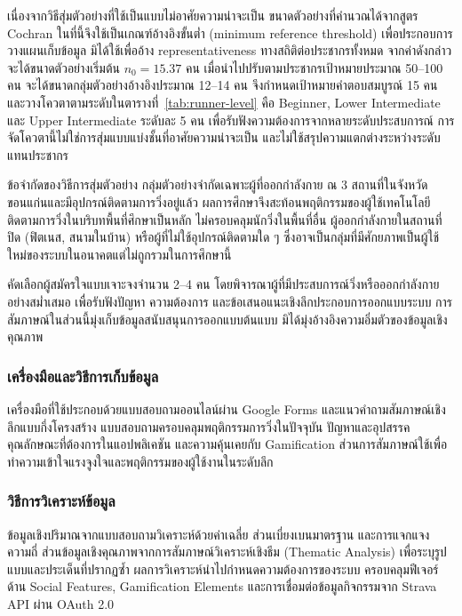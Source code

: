เนื่องจากวิธีสุ่มตัวอย่างที่ใช้เป็นแบบไม่อาศัยความน่าจะเป็น ขนาดตัวอย่างที่คำนวณได้จากสูตร Cochran ในที่นี้จึงใช้เป็นเกณฑ์อ้างอิงขั้นต่ำ (minimum reference threshold) เพื่อประกอบการวางแผนเก็บข้อมูล มิได้ใช้เพื่ออ้าง representativeness ทางสถิติต่อประชากรทั้งหมด จากค่าดังกล่าวจะได้ขนาดตัวอย่างเริ่มต้น $n_0=15.37$ คน เมื่อนำไปปรับตามประชากรเป้าหมายประมาณ 50--100 คน
จะได้ขนาดกลุ่มตัวอย่างอ้างอิงประมาณ 12--14 คน จึงกำหนดเป้าหมายคำตอบสมบูรณ์ 15 คน และวางโควตาตามระดับในตารางที่~\ref{tab:runner-level} คือ Beginner, Lower Intermediate และ Upper Intermediate ระดับละ 5 คน เพื่อรับฟังความต้องการจากหลายระดับประสบการณ์ การจัดโควตานี้ไม่ใช่การสุ่มแบบแบ่งชั้นที่อาศัยความน่าจะเป็น และไม่ใช้สรุปความแตกต่างระหว่างระดับแทนประชากร

ข้อจำกัดของวิธีการสุ่มตัวอย่าง กลุ่มตัวอย่างจำกัดเฉพาะผู้ที่ออกกำลังกาย ณ 3 สถานที่ในจังหวัดขอนแก่นและมีอุปกรณ์ติดตามการวิ่งอยู่แล้ว ผลการศึกษาจึงสะท้อนพฤติกรรมของผู้ใช้เทคโนโลยีติดตามการวิ่งในบริบทพื้นที่ศึกษาเป็นหลัก ไม่ครอบคลุมนักวิ่งในพื้นที่อื่น ผู้ออกกำลังกายในสถานที่ปิด (ฟิตเนส, สนามในบ้าน) หรือผู้ที่ไม่ใช้อุปกรณ์ติดตามใด ๆ ซึ่งอาจเป็นกลุ่มที่มีศักยภาพเป็นผู้ใช้ใหม่ของระบบในอนาคตแต่ไม่ถูกรวมในการศึกษานี้

คัดเลือกผู้สมัครใจแบบเจาะจงจำนวน 2--4 คน โดยพิจารณาผู้ที่มีประสบการณ์วิ่งหรือออกกำลังกายอย่างสม่ำเสมอ เพื่อรับฟังปัญหา ความต้องการ และข้อเสนอแนะเชิงลึกประกอบการออกแบบระบบ การสัมภาษณ์ในส่วนนี้มุ่งเก็บข้อมูลสนับสนุนการออกแบบต้นแบบ มิได้มุ่งอ้างอิงความอิ่มตัวของข้อมูลเชิงคุณภาพ

\subsubsection{เครื่องมือและวิธีการเก็บข้อมูล}

เครื่องมือที่ใช้ประกอบด้วยแบบสอบถามออนไลน์ผ่าน Google Forms และแนวคำถามสัมภาษณ์เชิงลึกแบบกึ่งโครงสร้าง แบบสอบถามครอบคลุมพฤติกรรมการวิ่งในปัจจุบัน ปัญหาและอุปสรรค คุณลักษณะที่ต้องการในแอปพลิเคชัน และความคุ้นเคยกับ Gamification ส่วนการสัมภาษณ์ใช้เพื่อทำความเข้าใจแรงจูงใจและพฤติกรรมของผู้ใช้งานในระดับลึก

\subsubsection{วิธีการวิเคราะห์ข้อมูล}

ข้อมูลเชิงปริมาณจากแบบสอบถามวิเคราะห์ด้วยค่าเฉลี่ย ส่วนเบี่ยงเบนมาตรฐาน และการแจกแจงความถี่ ส่วนข้อมูลเชิงคุณภาพจากการสัมภาษณ์วิเคราะห์เชิงธีม (Thematic Analysis) เพื่อระบุรูปแบบและประเด็นที่ปรากฏซ้ำ ผลการวิเคราะห์นำไปกำหนดความต้องการของระบบ ครอบคลุมฟีเจอร์ด้าน Social Features, Gamification Elements และการเชื่อมต่อข้อมูลกิจกรรมจาก Strava API ผ่าน OAuth 2.0

